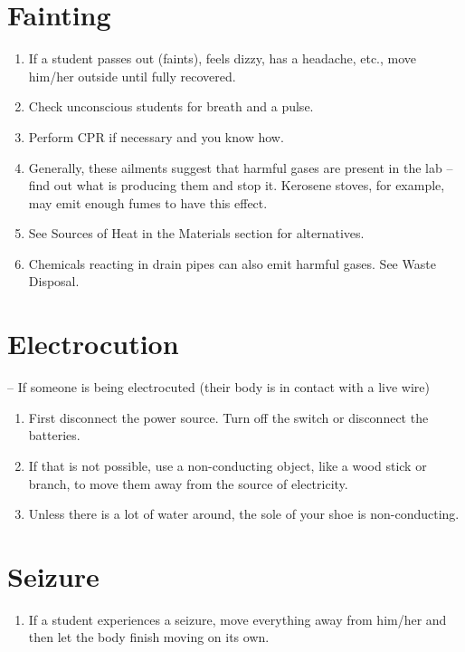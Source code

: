 \section{Fainting}
\begin{enumerate}
\item{If a student passes out (faints), feels dizzy, has a headache, etc., 
move him/her outside until fully recovered.}
\item{Check unconscious students for breath and a pulse.}
\item{Perform CPR if necessary and you know how.}
\item{Generally, these ailments suggest 
that harmful gases are present in the lab -- 
find out what is producing them and stop it. 
Kerosene stoves, for example, may emit enough fumes to have this effect.}
\item{See Sources of Heat in the Materials section for alternatives.}
\item{Chemicals reacting in drain pipes can also emit harmful gases. 
See Waste Disposal.}
\end{enumerate}

\section{Electrocution} -- If someone is being electrocuted 
(their body is in contact with a live wire)
\begin{enumerate}
\item{First disconnect the power source. 
Turn off the switch or disconnect the batteries.}
\item{If that is not possible, use a non-conducting object, 
like a wood stick or branch, to move them away from the source of electricity.}
\item{Unless there is a lot of water around, 
the sole of your shoe is non-conducting.}
\end{enumerate}

\section{Seizure}
\begin{enumerate}
\item{If a student experiences a seizure, 
move everything away from him/her 
and then let the body finish moving on its own.}
\end{enumerate}
